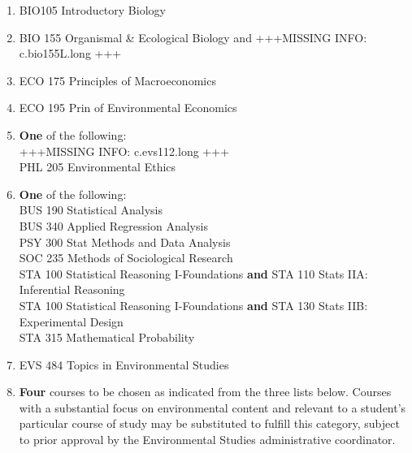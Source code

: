 \documentclass[
  letterpaper,
]{scrbook}
\providecommand{\tightlist}{%
  \setlength{\itemsep}{0pt}\setlength{\parskip}{0pt}}
\begin{document}
\begin{enumerate}
\def\labelenumi{\arabic{enumi}.}
\tightlist
\item
  BIO105 Introductory Biology
\item
  BIO 155 Organismal \& Ecological Biology and +++MISSING INFO:
  c.bio155L.long +++
\item
  ECO 175 Principles of Macroeconomics
\item
  ECO 195 Prin of Environmental Economics
\item
  \textbf{One} of the following:\\
  +++MISSING INFO: c.evs112.long +++\\
  PHL 205 Environmental Ethics\\
\item
  \textbf{One} of the following:\\
  BUS 190 Statistical Analysis\\
  BUS 340 Applied Regression Analysis\\
  PSY 300 Stat Methods and Data Analysis\\
  SOC 235 Methods of Sociological Research\\
  STA 100 Statistical Reasoning I-Foundations \textbf{and} STA 110 Stats
  IIA: Inferential Reasoning\\
  STA 100 Statistical Reasoning I-Foundations \textbf{and} STA 130 Stats
  IIB: Experimental Design\\
  STA 315 Mathematical Probability\\
\item
  EVS 484 Topics in Environmental Studies
\item
  \textbf{Four} courses to be chosen as indicated from the three lists
  below. Courses with a substantial focus on environmental content and
  relevant to a student's particular course of study may be substituted
  to fulfill this category, subject to prior approval by the
  Environmental Studies administrative coordinator.


\end{enumerate}
\end{document}
